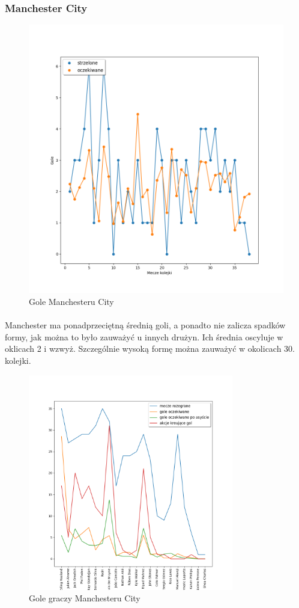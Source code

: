 \documentclass[12pt, letterpaper]{article}
\begin{document}
\subsubsection{Manchester City}
\begin{figure}[ht]
    \centering
    \includegraphics[width=.8\textwidth]{images/Manchester_goals.png}
    \caption{Gole Manchesteru City}
    \label{fig:enter-label}
\end{figure}
\paragraph{} Manchester ma ponadprzeciętną średnią goli, a ponadto nie zalicza spadków formy, jak można to było zauważyć u innych drużyn. Ich średnia oscyluje w oklicach 2 i wzwyż. Szczególnie wysoką formę można zauważyć w okolicach 30. kolejki.
\pagebreak
\begin{figure}[ht]
    \centering
    \includegraphics[width=0.8\textwidth]{images/Manchester_player_goals.png}
    \caption{Gole graczy Manchesteru City}
    \label{fig:enter-label}
\end{figure}
\end{document}
